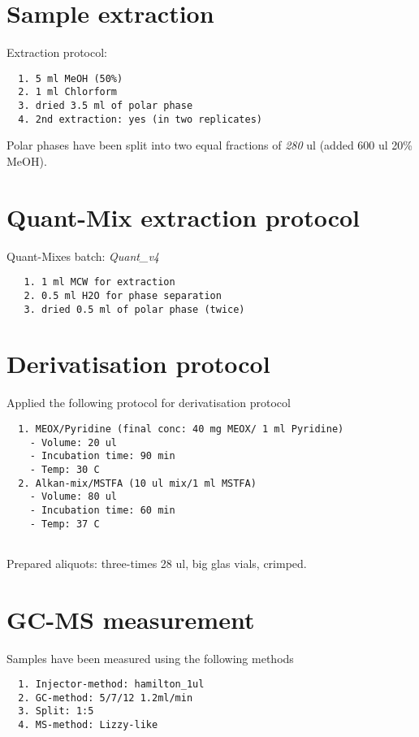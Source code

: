 \documentclass[10pt,]{article}
\begin{document}
\section{Sample extraction}\label{sample-extraction}

Extraction protocol:

\begin{verbatim}
  1. 5 ml MeOH (50%)
  2. 1 ml Chlorform
  3. dried 3.5 ml of polar phase
  4. 2nd extraction: yes (in two replicates)
\end{verbatim}

Polar phases have been split into two equal fractions of \emph{280} ul
(added 600 ul 20\% MeOH).

\section{Quant-Mix extraction
protocol}\label{quant-mix-extraction-protocol}

Quant-Mixes batch: \emph{Quant\_v4}

\begin{verbatim}
   1. 1 ml MCW for extraction
   2. 0.5 ml H2O for phase separation
   3. dried 0.5 ml of polar phase (twice)
\end{verbatim}

\section{Derivatisation protocol}\label{derivatisation-protocol}

Applied the following protocol for derivatisation protocol

\begin{verbatim}
  1. MEOX/Pyridine (final conc: 40 mg MEOX/ 1 ml Pyridine)
    - Volume: 20 ul
    - Incubation time: 90 min
    - Temp: 30 C
  2. Alkan-mix/MSTFA (10 ul mix/1 ml MSTFA)
    - Volume: 80 ul
    - Incubation time: 60 min
    - Temp: 37 C
    
\end{verbatim}

Prepared aliquots: three-times 28 ul, big glas vials, crimped.

\section{GC-MS measurement}\label{gc-ms-measurement}

Samples have been measured using the following methods

\begin{verbatim}
  1. Injector-method: hamilton_1ul
  2. GC-method: 5/7/12 1.2ml/min
  3. Split: 1:5
  4. MS-method: Lizzy-like
  
\end{verbatim}
\end{document}
